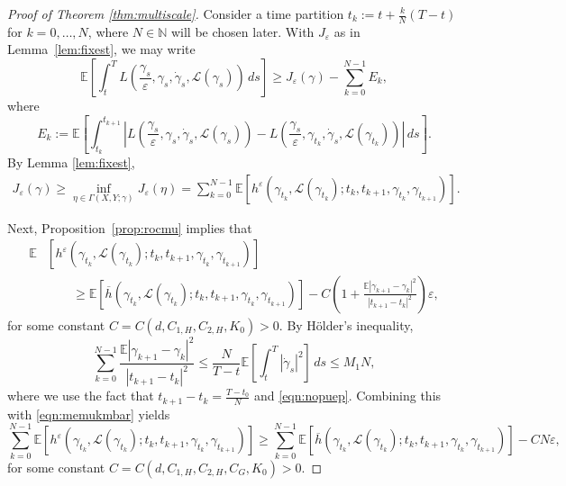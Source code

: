 \documentclass[reqno,11pt]{amsart}
\numberwithin{equation}{section}
\newcommand{\e}{\varepsilon}
\newcommand{\ep}{\varepsilon}
\newcommand{\nd}{\noindent}
\renewcommand{\bar}{\overline}
\begin{document}
\begin{proof}[Proof of Theorem \ref{thm:multiscale}]
Consider a time partition $t_k := t + \frac{k}{N}(T-t)$ for $ k=0,\dots,N$, where $N \in \mathbb{N}$ will be chosen later. With $J_\ep$ as in Lemma~\ref{lem:fixest}, we may write
\begin{equation}\label{eqn:opfixmu}
\mathbb{E}\left[\int_{t}^T L\left( \frac{\gamma_s}{\e}, \gamma_s, \dot{\gamma}_s, \mathcal{L}(\gamma_s) \right)\, ds \right]\geq J_\e (\gamma) - \sum_{k=0}^{N-1} E_k,
\end{equation}
where
\[
E_k:=\mathbb{E}\left[\int_{t_k}^{t_{k+1}} \left|L\left( \frac{\gamma_s}{\e}, \gamma_s, \dot{\gamma}_s, \mathcal{L}(\gamma_s) \right)-
L\left(\frac{\gamma_s}{\ep}, \gamma_{t_k}, \dot{\gamma}_s, \mathcal{L}(\gamma_{t_k})\right)\right|\,ds\right]. \]
By Lemma \ref{lem:fixest},
\begin{equation}\label{eqn:tpartest}
\begin{aligned}
J_\e(\gamma) \geq \inf_{\eta\in\Gamma(X,Y;\gamma)}
J_\e (\eta) =\sum_{k=0}^{N-1}
\mathbb E\left[h^\e\left(\gamma_{t_k}, \mathcal{L}(\gamma_{t_k}); t_k,t_{k+1},
\gamma_{t_k},\gamma_{t_{k+1}}\right)\right].
\end{aligned}
\end{equation}

\nd
Next, Proposition~\ref{prop:rocmu} implies that
\begin{equation}\label{eqn:memukmbar}
\begin{split}
\mathbb{E}&\left[h^\e\left(\gamma_{t_k}, \mathcal{L}(\gamma_{t_k}); t_k,t_{k+1},
\gamma_{t_k},\gamma_{t_{k+1}}\right)\right]\\
&\qquad\geq \mathbb{E}\left[\bar{h}\left(\gamma_{t_k}, \mathcal{L}(\gamma_{t_k}); t_k,t_{k+1},
\gamma_{t_k},\gamma_{t_{k+1}}\right)\right] -C\left(1+\frac{ \mathbb{E}\left|\gamma_{k+1}-\gamma_k\right|^2}{|t_{k+1}-t_k|^2}\right) \ep,
\end{split}
\end{equation}
for some constant $C=C(d, C_{1,H},C_{2,H},K_0)>0$.
By H\"older's inequality,
\[
\sum_{k=0}^{N-1}\frac{ \mathbb{E}\left|\gamma_{k+1}-\gamma_k\right|^2}{|t_{k+1}-t_k|^2}\leq \frac{N}{T-t} \mathbb{E} \left[\int_{t}^T\left|\dot{\gamma}_s\right|^2\right]\,
ds \leq M_1 N,
\]
where we use the fact that $t_{k+1}-t_k=\frac{T-t_0}{N}$ and \eqref{eqn:nopuep}. Combining this with \eqref{eqn:memukmbar} yields
\begin{equation}\label{eqn:rocsumerr}
\sum_{k=0}^{N-1}
\mathbb E\left[h^\e\left(\gamma_{t_k}, \mathcal{L}(\gamma_{t_k}); t_k,t_{k+1},
\gamma_{t_k},\gamma_{t_{k+1}}\right)\right]\geq \sum_{k=0}^{N-1}\mathbb{E}\left[\bar{h}\left(\gamma_{t_k}, \mathcal{L}(\gamma_{t_k}); t_k,t_{k+1},
\gamma_{t_k},\gamma_{t_{k+1}}\right)\right] -C N\ep,
\end{equation}
for some constant $C=C(d, C_{1,H},C_{2,H},C_G, K_0)>0$.



\end{proof}
\end{document}

